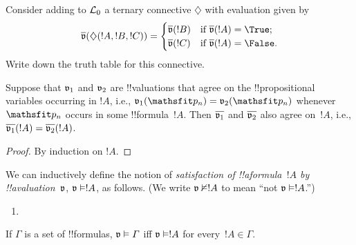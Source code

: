 \documentclass[../../../include/open-logic-section]{subfiles}
\begin{document}
\begin{prob}
Consider adding to $\Lang{L_0}$ a ternary connective $\diamondsuit$
with evaluation given by
\begin{gather*}
  \pValue{v}(\diamondsuit( !A , !B , !C ) ) = \begin{cases}
    \pValue{v}( !B ) &
    \text{if $\pValue{v}(!A) = \True$;}\\
    \pValue{v}( !C ) &
    \text{if $\pValue{v}(!A) = \False $}.
  \end{cases}
\end{gather*}
Write down the truth table for this connective.
\end{prob}

\begin{thm}
 Suppose that $\pAssign{v_1}$ and
$\pAssign{v_2}$ are !!{valuation}s that agree on the !!{propositional
variable}s occurring in $!A$, i.e., $\pAssign{v_1}(\Obj p_n) =
\pAssign{v_2}(\Obj p_n)$ whenever $\Obj p_n$ occurs in some
!!{formula}~$!A$. Then $\pValue{v_1}$ and $\pValue{v_2}$ also agree
on~$!A$, i.e., $\pValue{v_1}(!A) = \pValue{v_2}(!A)$.
\end{thm}

\begin{proof}
By induction on $!A$.
\end{proof}

\begin{defn}[Satisfaction]
 We can inductively define the notion of
  \emph{satisfaction of !!a{formula}~$!A$ by
  !!a{valuation}~$\pAssign{v}$}, $\pSat{v}{!A}$, as follows.
  (We write $\pSat/{v}{!A}$ to mean ``not $\pSat{v}{!A}$.'')
\begin{enumerate}


\item {}





\end{enumerate}
If $\Gamma$ is a set of !!{formula}s, $\pSat{v}{\Gamma}$ iff
$\pSat{v}{!A}$ for every~$!A \in \Gamma$.
\end{defn}
\end{document}
